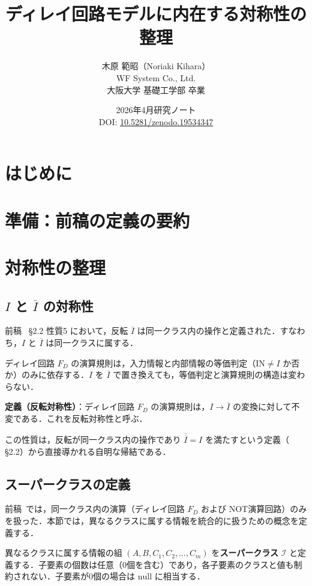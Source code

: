 \documentclass[12pt,a4paper]{ltjsarticle}
\title{ディレイ回路モデルに内在する対称性の整理}
\author{木原 範昭（Noriaki Kihara）\\
WF System Co., Ltd.\\
大阪大学 基礎工学部 卒業}
\date{2026年4月\quad 研究ノート\\[4pt]
DOI: \href{https://doi.org/10.5281/zenodo.19534347}{10.5281/zenodo.19534347}}
\begin{document}
\maketitle

\begin{abstract}
\end{abstract}

\section{はじめに}

\section{準備：前稿の定義の要約}

\section{対称性の整理}

\subsection{$I$ と $\overline{I}$ の対称性}

前稿~\cite{ref1} \S 2.2 性質5 において，反転 $\overline{I}$ は同一クラス内の操作と定義された．すなわち，$I$ と $\overline{I}$ は同一クラスに属する．

ディレイ回路 $F_D$ の演算規則は，入力情報と内部情報の等価判定（$\mathrm{IN} \neq I$ か否か）のみに依存する．$I$ を $\overline{I}$ で置き換えても，等価判定と演算規則の構造は変わらない．

\textbf{定義（反転対称性）}：ディレイ回路 $F_D$ の演算規則は，$I \to \overline{I}$ の変換に対して不変である．これを反転対称性と呼ぶ．

この性質は，反転が同一クラス内の操作であり $\overline{\overline{I}} = I$ を満たすという定義（\cite{ref1} \S 2.2）から直接導かれる自明な帰結である．

\subsection{スーパークラスの定義}

前稿~\cite{ref1}では，同一クラス内の演算（ディレイ回路 $F_D$ および NOT演算回路）のみを扱った．本節では，異なるクラスに属する情報を統合的に扱うための概念を定義する．

異なるクラスに属する情報の組 $(A, B, C_1, C_2, \ldots, C_m)$ を\textbf{スーパークラス} $\mathcal{I}$ と定義する．子要素の個数は任意（0個を含む）であり，各子要素のクラスと値も制約されない．子要素が0個の場合は $\mathrm{null}$ に相当する．
\end{document}
